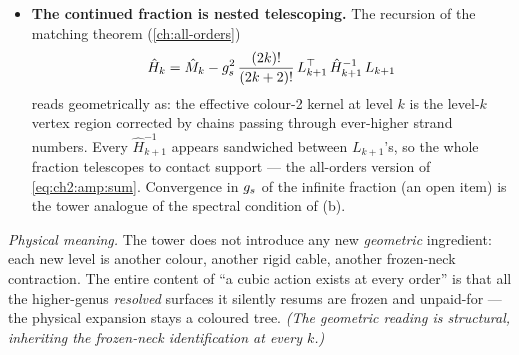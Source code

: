 \begin{itemize}[leftmargin=*]
	\item \textbf{The continued fraction is nested telescoping.} The recursion of the matching theorem (\cref{ch:all-orders})
	\begin{equation}
		\hat H_k
		= \hat M_k
		- g_s^2\,\frac{(2k)!}{(2k+2)!}\,L_{k+1}^\top\,\hat H_{k+1}^{-1}\,L_{k+1}
		\label{rs:eq:cfrac}
	\end{equation}
	reads geometrically as: the effective colour-2 kernel at level $k$ is the
	level-$k$ vertex region corrected by chains passing through ever-higher strand
	numbers. Every $\hat H_{k+1}^{-1}$ appears sandwiched between $L_{k+1}$'s, so
	the whole fraction telescopes to contact support --- the all-orders version of
	\eqref{eq:ch2:amp:sum}. Convergence in $g_s$ of the infinite fraction (an open
	item) is the tower analogue of the spectral condition of (b).
\end{itemize}

\medskip
\noindent\emph{Physical meaning.} The tower does not introduce any new
\emph{geometric} ingredient: each new level is another colour, another rigid
cable, another frozen-neck contraction. The entire content of ``a cubic action
exists at every order'' is that all the higher-genus \emph{resolved}
surfaces it silently resums are frozen and unpaid-for --- the physical expansion
stays a coloured tree. \emph{(The geometric reading is
structural, inheriting the frozen-neck identification at every $k$.)}


